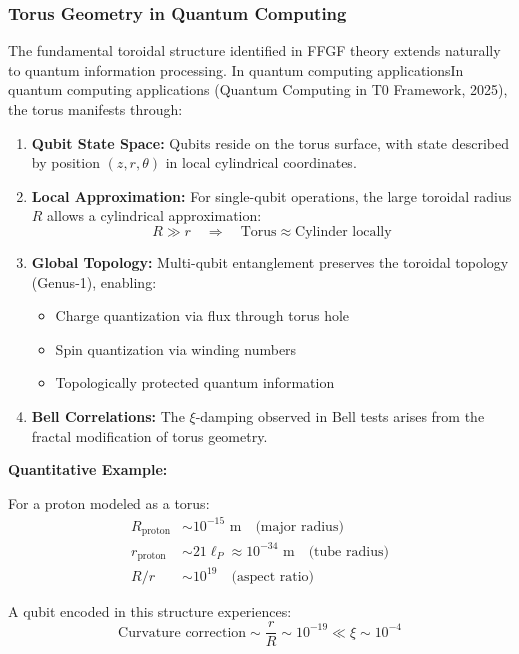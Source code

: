 \subsubsection{Torus Geometry in Quantum Computing}

The fundamental toroidal structure identified in FFGF theory extends 
naturally to quantum information processing. In quantum computing 
applicationsIn quantum computing applications (Quantum Computing in T0 Framework, 2025), the torus manifests through:

\begin{enumerate}
	\item \textbf{Qubit State Space:} Qubits reside on the torus surface, 
	with state described by position $(z, r, \theta)$ in local 
	cylindrical coordinates.
	
	\item \textbf{Local Approximation:} For single-qubit operations, the 
	large toroidal radius $R$ allows a cylindrical approximation:
	\[
	R \gg r \quad \Rightarrow \quad 
	\text{Torus} \approx \text{Cylinder locally}
	\]
	
	\item \textbf{Global Topology:} Multi-qubit entanglement preserves the 
	toroidal topology (Genus-1), enabling:
	\begin{itemize}
		\item Charge quantization via flux through torus hole
		\item Spin quantization via winding numbers
		\item Topologically protected quantum information
	\end{itemize}
	
	\item \textbf{Bell Correlations:} The $\xi$-damping observed in Bell 
	tests arises from the fractal modification of torus geometry.
\end{enumerate}

\textbf{Quantitative Example:}

For a proton modeled as a torus:
\begin{align}
	R_{\text{proton}} &\sim 10^{-15} \text{ m} \quad \text{(major radius)} \\
	r_{\text{proton}} &\sim 21\ell_P \approx 10^{-34} \text{ m} \quad 
	\text{(tube radius)} \\
	R/r &\sim 10^{19} \quad \text{(aspect ratio)}
\end{align}

A qubit encoded in this structure experiences:
\[
\text{Curvature correction} \sim \frac{r}{R} \sim 10^{-19} 
\ll \xi \sim 10^{-4}
\]


